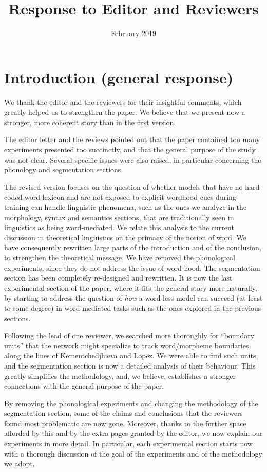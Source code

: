 \documentclass{article}
\title{Response to Editor and Reviewers}
\date{February 2019}
\begin{document}
\maketitle


\section{Introduction (general response)}

We thank the editor and the reviewers for their insightful comments, which greatly helped us to strengthen the paper. We believe that we present now a stronger, more coherent story than in the first version.

The editor letter and the reviews pointed out that the paper contained too many experiments presented too succinctly, and that the general purpose of the study was not clear. Several specific issues were also raised, in particular concerning the phonology and segmentation sections.

The revised version focuses on the question of whether models that have no hard-coded word lexicon and are not exposed to explicit wordhood cues during training can handle linguistic phenomena, such as the ones we analyze in the morphology, syntax and semantics sections, that are traditionally seen in linguistics as being word-mediated. We relate this analysis to the current discussion in theoretical linguistics on the primacy of the notion of word. We have consequently rewritten large parts of the introduction and of the conclusion, to strengthen the theoretical message. We have removed the phonological experiments, since they do not address the issue of word-hood. The segmentation section has been completely re-designed and rewritten. It is now the last experimental section of the paper, where it fits the general story more naturally, by starting to address the question of \emph{how} a word-less model can succeed (at least to some degree) in word-mediated tasks such as the ones explored in the previous sections.

Following the lead of one reviewer, we searched more thoroughly for ``boundary units'' that the network might specialize to track word/morpheme boundaries, along the lines of Kementchedjhieva and Lopez. We were able to find such units, and the segmentation section is now a detailed analysis of their behaviour. This greatly simplifies the methodology, and, we believe, establishes a stronger connections with the general purpose of the paper.

By removing the phonological experiments and changing the methodology of the segmentation section, some of the claims and conclusions that the reviewers found most problematic are now gone. Moreover, thanks to the further space afforded by this and by the extra pages granted by the editor, we now explain our experiments in more detail. In particular, each experimental section starts now with a thorough discussion of the goal of the experiments and of the methodology we adopt.
\end{document}
